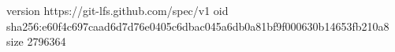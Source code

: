 version https://git-lfs.github.com/spec/v1
oid sha256:e60f4c697caad6d7d76e0405c6dbac045a6db0a81bf9f000630b14653fb210a8
size 2796364
